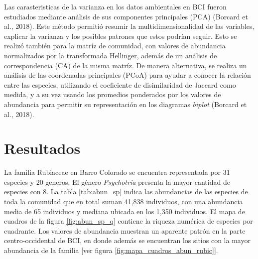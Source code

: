 \documentclass[11pt,]{article}
\begin{document}
Las carasteristicas de la varianza en los datos ambientales en BCI
fueron estudiados mediante análisis de sus componentes principales (PCA)
(Borcard et al., 2018). Este método permitió resumir la
multidimensionalidad de las variables, explicar la varianza y los
posibles patrones que estos podrían seguir. Esto se realizó también para
la matríz de comunidad, con valores de abundancia normalizados por la
transformada Hellinger, además de un análisis de correspondencia (CA) de
la misma matríz. De manera alternativa, se realiza un análisis de las
coordenadas principales (PCoA) para ayudar a conocer la relación entre
las especies, utilizando el coeficiente de disimilaridad de Jaccard como
medida, y a su vez usando los promedios ponderados por los valores de
abundancia para permitir su representación en los diagramas
\emph{biplot} (Borcard et al., 2018).

\section{Resultados}\label{resultados}

La familia Rubiaceae en Barro Colorado se encuentra representada por 31
especies y 20 generos. El género \emph{Psychotria} presenta la mayor
cantidad de especies con 8. La tabla \ref{tab:abun_sp} indica las
abundancias de las especies de toda la comunidad que en total suman
41,838 individuos, con una abundancia media de 65 individuos y mediana
ubicada en los 1,350 individuos. El mapa de cuadros de la figura
\ref{fig:abun_sp_q} contiene la riqueza numérica de especies por
cuadrante. Los valores de abundancia muestran un aparente patrón en la
parte centro-occidental de BCI, en donde además se encuentran los sitios
con la mayor abundancia de la familia {[}ver figura
\ref{fig:mapa_cuadros_abun_rubic}{]}.
\end{document}
